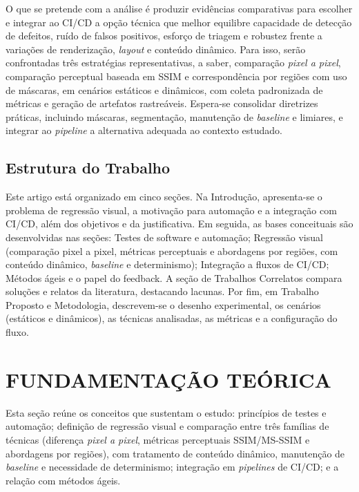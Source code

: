 \documentclass{UNESC}
\begin{document}
{O que se pretende com a análise é produzir evidências comparativas para escolher e integrar ao CI/CD a opção técnica que melhor equilibre capacidade de detecção de defeitos, ruído de falsos positivos, esforço de triagem e robustez frente a variações de renderização, \emph{layout} e conteúdo dinâmico. Para isso, serão confrontadas três estratégias representativas, a saber, comparação \emph{pixel a pixel}, comparação perceptual baseada em SSIM e correspondência por regiões com uso de máscaras, em cenários estáticos e dinâmicos, com coleta padronizada de métricas e geração de artefatos rastreáveis. Espera-se consolidar diretrizes práticas, incluindo máscaras, segmentação, manutenção de \emph{baseline} e limiares, e integrar ao \emph{pipeline} a alternativa adequada ao contexto estudado.
}

\subsection{Estrutura do Trabalho}
Este artigo está organizado em cinco seções. Na Introdução, apresenta-se o problema de regressão visual, a motivação para automação e a integração com CI/CD, além dos objetivos e da justificativa. Em seguida, as bases conceituais são desenvolvidas nas seções: Testes de software e automação; Regressão visual (comparação pixel a pixel, métricas perceptuais e abordagens por regiões, com conteúdo dinâmico, \emph{baseline} e determinismo); Integração a fluxos de CI/CD; Métodos ágeis e o papel do feedback. A seção de Trabalhos Correlatos compara soluções e relatos da literatura, destacando lacunas. Por fim, em Trabalho Proposto e Metodologia, descrevem-se o desenho experimental, os cenários (estáticos e dinâmicos), as técnicas analisadas, as métricas e a configuração do fluxo.

\section{FUNDAMENTAÇÃO TEÓRICA}

Esta seção reúne os conceitos que sustentam o estudo: princípios de testes e automação; definição de regressão visual e comparação entre três famílias de técnicas (diferença \emph{pixel a pixel}, métricas perceptuais SSIM/MS-SSIM e abordagens por regiões), com tratamento de conteúdo dinâmico, manutenção de \emph{baseline} e necessidade de determinismo; integração em \emph{pipelines} de CI/CD; e a relação com métodos ágeis.
\end{document}

